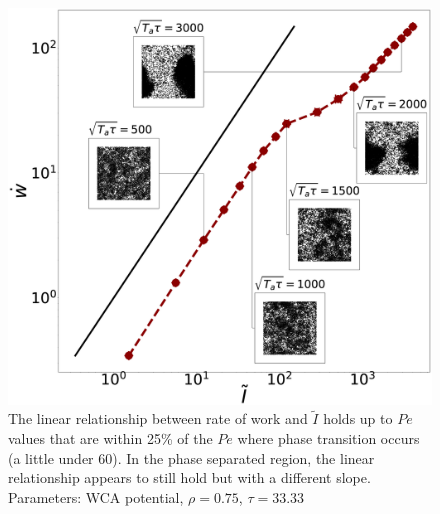 \documentclass[superscriptaddress, twocolumn, prl, longbibliography, nofootinbib]{revtex4-1}
\begin{document}
\begin{figure}
    \centering
    \includegraphics[scale=0.09, clip=True]{Figure_3.eps}
    \caption{The linear relationship between rate of work and $\tilde{I}$ holds up to $Pe$ values that are within 25\% of the $Pe$ where phase transition occurs (a little under 60). In the phase separated region, the linear relationship appears to still hold but with a different slope. Parameters: WCA potential, $\rho =0.75$, $\tau = 33.33$}
    \label{Fig:3}
\end{figure}
\end{document}

